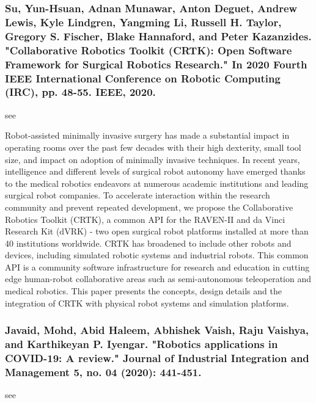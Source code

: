 \documentclass[conference]{IEEEtran}
\begin{document}
\medskip
\subsubsection{Su, Yun-Hsuan, Adnan Munawar, Anton Deguet, Andrew Lewis, Kyle Lindgren, Yangming Li, Russell H. Taylor, Gregory S. Fischer, Blake Hannaford, and Peter Kazanzides. "Collaborative Robotics Toolkit (CRTK): Open Software Framework for Surgical Robotics Research." In 2020 Fourth IEEE International Conference on Robotic Computing (IRC), pp. 48-55. IEEE, 2020.}
see \cite{su2020collaborative}

Robot-assisted minimally invasive surgery has made a substantial impact in operating rooms over the past few decades with their high dexterity, small tool size, and impact on adoption of minimally invasive techniques. In recent years, intelligence and different levels of surgical robot autonomy have emerged thanks to the medical robotics endeavors at numerous academic institutions and leading surgical robot companies. To accelerate interaction within the research community and prevent repeated development, we propose the Collaborative Robotics Toolkit (CRTK), a common API for the RAVEN-II and da Vinci Research Kit (dVRK) - two open surgical robot platforms installed at more than 40 institutions worldwide. CRTK has broadened to include other robots and devices, including simulated robotic systems and industrial robots. This common API is a community software infrastructure for research and education in cutting edge human-robot collaborative areas such as semi-autonomous teleoperation and medical robotics. This paper presents the concepts, design details and the integration of CRTK with physical robot systems and simulation platforms.

\medskip
\subsubsection{Javaid, Mohd, Abid Haleem, Abhishek Vaish, Raju Vaishya, and Karthikeyan P. Iyengar. "Robotics applications in COVID-19: A review." Journal of Industrial Integration and Management 5, no. 04 (2020): 441-451.}
see \cite{javaid2020robotics}
\end{document}
